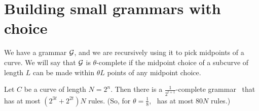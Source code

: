   \eitem

\section{Building small grammars with choice}

We have a grammar ${\mathcal G}$, and we are recursively using it to pick
midpoints of a curve. We will say that ${\mathcal G}$ is $\theta$-complete if
the midpoint choice of a subcurve of length $L$ can be made within
$\theta L$ points of any midpoint choice.

\begin{thm}
Let $C$ be a curve of length $N = 2^n$. Then there is a
$\frac{1}{2^{t+1}}$-complete grammar \GGG\ that has at most
$(2^{3t} + 2^{2t}) N$ rules. (So, for $\theta=\frac{1}{8}$,
\GGG\ has at most $80 N$ rules.)
\end{thm}

